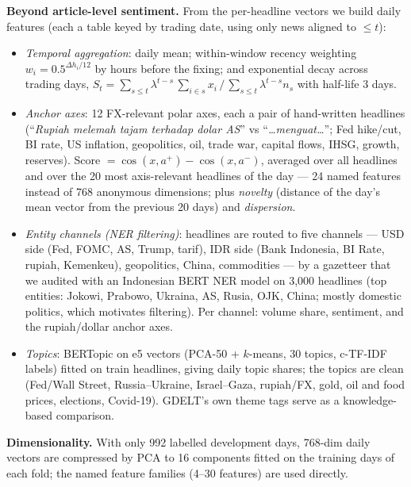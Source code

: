 \documentclass[10pt,a4paper]{article}
\begin{document}
\textbf{Beyond article-level sentiment.} From the per-headline vectors we build daily features (each a table keyed by trading date, using only news aligned to $\le t$):
\begin{itemize}
\item \emph{Temporal aggregation}: daily mean; within-window recency weighting $w_i=0.5^{\Delta h_i/12}$ by hours before the fixing; and exponential decay across trading days, $S_t=\sum_{s\le t}\lambda^{t-s}\,\textstyle\sum_{i\in s}x_i \,/\, \sum_{s\le t}\lambda^{t-s} n_s$ with half-life 3 days.
\item \emph{Anchor axes}: 12 FX-relevant polar axes, each a pair of hand-written headlines (``\emph{Rupiah melemah tajam terhadap dolar AS}'' vs ``\emph{\dots menguat\dots}''; Fed hike/cut, BI rate, US inflation, geopolitics, oil, trade war, capital flows, IHSG, growth, reserves). Score $=\cos(x,a^+)-\cos(x,a^-)$, averaged over all headlines and over the 20 most axis-relevant headlines of the day --- 24 named features instead of 768 anonymous dimensions; plus \emph{novelty} (distance of the day's mean vector from the previous 20 days) and \emph{dispersion}.
\item \emph{Entity channels (NER filtering)}: headlines are routed to five channels --- USD side (Fed, FOMC, AS, Trump, tarif), IDR side (Bank Indonesia, BI Rate, rupiah, Kemenkeu), geopolitics, China, commodities --- by a gazetteer that we audited with an Indonesian BERT NER model on 3,000 headlines (top entities: Jokowi, Prabowo, Ukraina, AS, Rusia, OJK, China; mostly domestic politics, which motivates filtering). Per channel: volume share, sentiment, and the rupiah/dollar anchor axes.
\item \emph{Topics}: BERTopic on e5 vectors (PCA-50 + $k$-means, 30 topics, c-TF-IDF labels) fitted on train headlines, giving daily topic shares; the topics are clean (Fed/Wall Street, Russia--Ukraine, Israel--Gaza, rupiah/FX, gold, oil and food prices, elections, Covid-19). GDELT's own theme tags serve as a knowledge-based comparison.
\end{itemize}
\textbf{Dimensionality.} With only 992 labelled development days, 768-dim daily vectors are compressed by PCA to 16 components fitted on the training days of each fold; the named feature families (4--30 features) are used directly.
\end{document}
